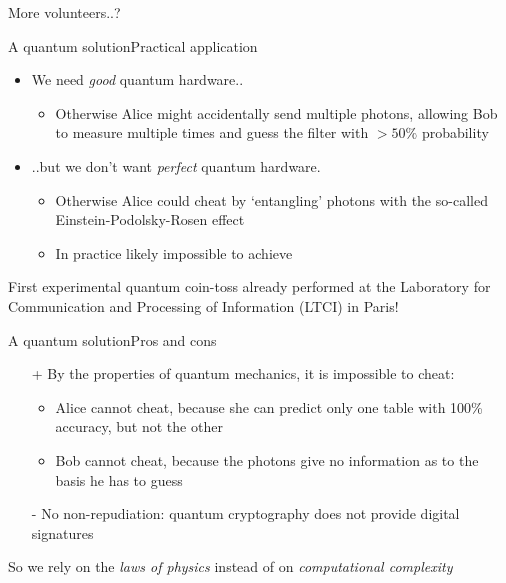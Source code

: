 \documentclass{beamer}
\begin{document}
\begin{frame}[plain,c]
    \begin{center}
        \Huge More volunteers..?
    \end{center}
\end{frame}

\begin{frame}{A quantum solution}{Practical application}
\begin{itemize}
    \item We need \emph{good} quantum hardware..
        \begin{itemize}
            \item Otherwise Alice might accidentally send multiple photons, allowing Bob to measure multiple times and guess the filter with $>50\%$ probability
        \end{itemize}
    \item ..but we don't want \emph{perfect} quantum hardware.
        \begin{itemize}
            \item Otherwise Alice could cheat by `entangling' photons with the so-called Einstein-Podolsky-Rosen effect
            \item In practice likely impossible to achieve
        \end{itemize}
\end{itemize}
First experimental quantum coin-toss already performed at the Laboratory for Communication and Processing of Information (LTCI) in Paris!
\end{frame}

\begin{frame}{A quantum solution}{Pros and cons}
    \begin{itemize}
        \item[+] By the properties of quantum mechanics, it is impossible to cheat:
        \begin{itemize}
            \item Alice cannot cheat, because she can predict only one table with 100\% accuracy, but not the other
            \item Bob cannot cheat, because the photons give no information as to the basis he has to guess
        \end{itemize}
        \item[-] No non-repudiation: quantum cryptography does not provide digital signatures
    \end{itemize}

    So we rely on the \emph{laws of physics} instead of on \emph{computational complexity}
\end{frame}
\end{document}
